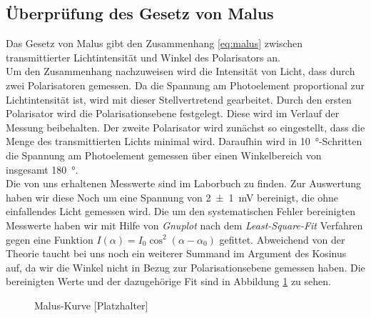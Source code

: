 \subsection{Überprüfung des Gesetz von Malus}
Das Gesetz von Malus gibt den Zusammenhang \eqref{eq:malus} zwischen transmittierter Lichtintensität und Winkel des Polarisators an.\\
Um den Zusammenhang nachzuweisen wird die Intensität von Licht, dass durch zwei Polarisatoren
gemessen. Da die Spannung am Photoelement proportional zur Lichtintensität ist, wird mit dieser Stellvertretend gearbeitet. Durch den ersten Polarisator wird die Polarisationsebene festgelegt. Diese wird im Verlauf der Messung beibehalten. Der zweite Polarisator wird zunächst so eingestellt, dass die Menge des transmittierten Lichts minimal wird. Daraufhin wird in \SI{10}{\degree}-Schritten die Spannung am Photoelement gemessen über einen Winkelbereich von insgesamt \SI{180}{\degree}.\\
Die von uns erhaltenen Messwerte sind im Laborbuch zu finden. Zur Auswertung haben wir diese Noch um eine Spannung von \SI{2+-1}{mV} bereinigt, die ohne einfallendes Licht gemessen wird.
Die um den systematischen Fehler bereinigten Messwerte haben wir mit Hilfe von \textit{Gnuplot} nach dem \textit{Least-Square-Fit} Verfahren gegen eine Funktion $ I(\alpha)  = I_0 \cos^2(\alpha-\alpha_0)$ gefittet. Abweichend von der Theorie taucht bei uns noch ein weiterer Summand im Argument des Kosinus auf, da wir die Winkel nicht in Bezug zur Polarisationsebene gemessen haben. Die bereinigten Werte und der dazugehörige Fit sind in Abbildung \ref{fig:malus} zu sehen.
\begin{figure}[H]
\centering
\def\h{10cm}

\caption{Malus-Kurve [Platzhalter]}
\label{fig:malus}
\end{figure}


